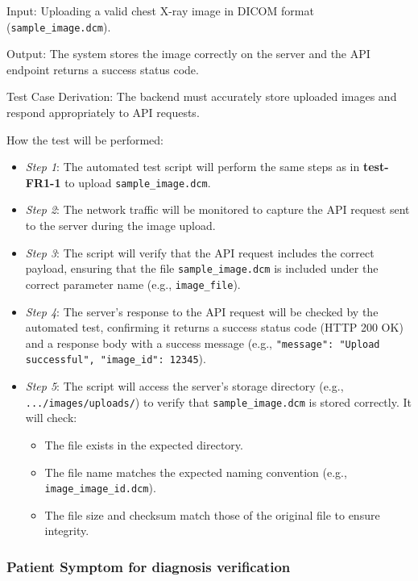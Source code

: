 \documentclass[12pt, titlepage]{article}
\begin{document}
\begin{enumerate}
Input: Uploading a valid chest X-ray image in DICOM format (\texttt{sample\_image.dcm}).

Output: The system stores the image correctly on the server and the API endpoint returns a success status code.

Test Case Derivation: The backend must accurately store uploaded images and respond appropriately to API requests.

How the test will be performed: 
\begin{itemize}
  \item[-] \textit{Step 1}: The automated test script will perform the same steps as in \textbf{test-FR1-1} to upload \texttt{sample\_image.dcm}.
  \item[-] \textit{Step 2}: The network traffic will be monitored to capture the API request sent to the server during the image upload.
  \item[-] \textit{Step 3}: The script will verify that the API request includes the correct payload, ensuring that the file \texttt{sample\_image.dcm} is included under the correct parameter name (e.g., \texttt{image\_file}).
  \item[-] \textit{Step 4}: The server's response to the API request will be checked by the automated test, confirming it returns a success status code (HTTP 200 OK) and a response body with a success message (e.g., \texttt{{"message": "Upload successful", "image\_id": 12345}}).
  \item[-] \textit{Step 5}: The script will access the server's storage directory (e.g., \texttt{.../images/uploads/}) to verify that \texttt{sample\_image.dcm} is stored correctly. It will check:
    \begin{itemize}
      \item The file exists in the expected directory.
      \item The file name matches the expected naming convention (e.g., \texttt{image\_{image\_id}.dcm}).
      \item The file size and checksum match those of the original file to ensure integrity.
    \end{itemize}
  \end{itemize}
\end{enumerate}

\subsubsection{Patient Symptom for diagnosis verification }
\end{document}
